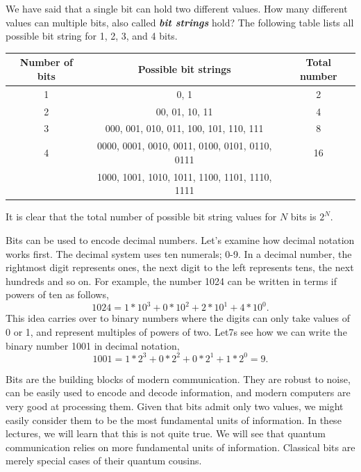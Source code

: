 We have said that a single bit can hold two different values.
How many different values can multiple bits, also called \textit{\textbf{bit strings}} hold?
The following table lists all possible bit string for 1, 2, 3, and 4 bits.
\begin{table}[h]
    \centering
    \begin{tabular}{c|c|c}
        Number of bits  & Possible bit strings & Total number \\
        \hline
        1 & 0, 1 & 2 \\
        2 & 00, 01, 10, 11 & 4 \\
        3 & 000, 001, 010, 011, 100, 101, 110, 111 & 8 \\
        4 & 0000, 0001, 0010, 0011, 0100, 0101, 0110, 0111 & 16 \\
        & 1000, 1001, 1010, 1011, 1100, 1101, 1110, 1111 & 
    \end{tabular}
\end{table}
It is clear that the total number of possible bit string values for $N$ bits is $2^N$.

Bits can be used to encode decimal numbers.
Let's examine how decimal notation works first.
The decimal system uses ten numerals; 0-9.
In a decimal number, the rightmost digit represents ones, the next digit to the left represents tens, the next hundreds and so on.
For example, the number 1024 can be written in terms if powers of ten as follows,
\begin{equation}
    1024 = 1 * 10^3 + 0 * 10^2 + 2 * 10^1 + 4 * 10^0.
\end{equation}
This idea carries over to binary numbers where the digits can only take values of 0 or 1, and represent multiples of powers of two.
Let7s see how we can write the binary number 1001 in decimal notation,
\begin{equation}
    1001 = 1 * 2^3 + 0 * 2^2 + 0 * 2^1 + 1 * 2^0 = 9.
\end{equation}

Bits are the building blocks of modern communication.
They are robust to noise, can be easily used to encode and decode information, and modern computers are very good at processing them.
Given that bits admit only two values, we might easily consider them to be the most fundamental units of information.
In these lectures, we will learn that this is not quite true.
We will see that quantum communication relies on more fundamental units of information.
Classical bits are merely special cases of their quantum cousins.


